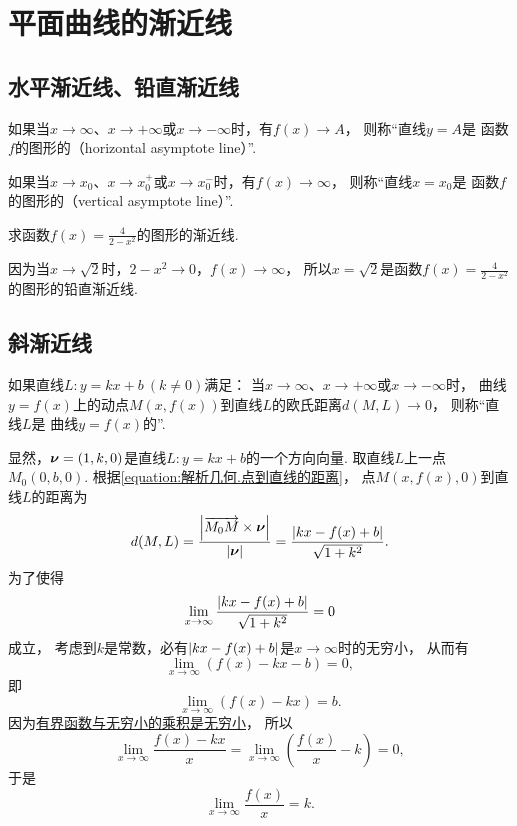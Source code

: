 \section{平面曲线的渐近线}
\subsection{水平渐近线、铅直渐近线}
如果当\(x\to\infty\)、\(x\to+\infty\)或\(x\to-\infty\)时，有\(f(x) \to A\)，
则称“直线\(y = A\)是
函数\(f\)的图形的（horizontal asymptote line）”.

如果当\(x \to x_0\)、\(x \to x_0^+\)或\(x \to x_0^-\)时，有\(f(x) \to \infty\)，
则称“直线\(x = x_0\)是
函数\(f\)的图形的（vertical asymptote line）”.

\begin{example}
求函数\(f(x)=\frac4{2-x^2}\)的图形的渐近线.
\begin{solution}
因为当\(x\to\sqrt2\)时，\(2-x^2\to0\)，\(f(x)\to\infty\)，
所以\(x=\sqrt2\)是函数\(f(x)=\frac4{2-x^2}\)的图形的铅直渐近线.
\end{solution}
\end{example}

\subsection{斜渐近线}
如果直线\(L: y = kx+b\ (k \neq 0)\)满足：
当\(x\to\infty\)、\(x\to+\infty\)或\(x\to-\infty\)时，
曲线\(y = f(x)\)上的动点\(M(x,f(x))\)到直线\(L\)的欧氏距离\(d(M,L)\to0\)，
则称“直线\(L\)是
曲线\(y = f(x)\)的”.

显然，\(\boldsymbol{\nu}=(1,k,0)\)是直线\(L: y=kx+b\)的一个方向向量.
取直线\(L\)上一点\(M_0(0,b,0)\).
根据\cref{equation:解析几何.点到直线的距离}，
点\(M(x,f(x),0)\)到直线\(L\)的距离为\[
	d(M,L)=\frac{\abs{\overrightarrow{M_0M}\times\boldsymbol{\nu}}}{\abs{\boldsymbol{\nu}}}
	=\frac{
		\abs{kx-f(x)+b}
	}{
		\sqrt{1+k^2}
	}.
\]
为了使得\[
	\lim_{x\to\infty} \frac{\abs{kx-f(x)+b}}{\sqrt{1+k^2}} = 0
\]成立，
考虑到\(k\)是常数，必有\(\abs{kx-f(x)+b}\)是\(x\to\infty\)时的无穷小，
从而有\[
	\lim_{x\to\infty} (f(x)-kx-b) = 0,
\]
即\[
	\lim_{x\to\infty} (f(x)-kx) = b.
\]
因为\hyperref[theorem:函数极限.无穷小.有界函数与无穷小的乘积是无穷小]{有界函数与无穷小的乘积是无穷小}，
所以\[
	\lim_{x\to\infty} \frac{f(x)-kx}{x}
	= \lim_{x\to\infty} \left( \frac{f(x)}x-k \right)
	= 0,
\]
于是\[
	\lim_{x\to\infty} \frac{f(x)}{x} = k.
\]


